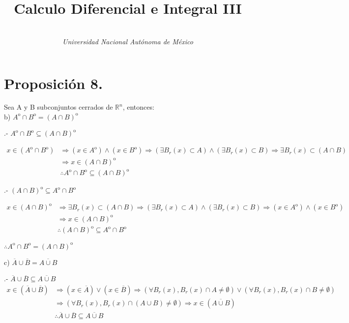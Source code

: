 \documentclass[secnumarabic,balancelastpage,amsmath,amssymb]{article}
\begin{document}
\title{\vspace{-15mm}\textbf{Calculo Diferencial e Integral III}}
\author{\\ \emph{Universidad Nacional Autónoma de México }}

\section{Proposición 8.}
Sea A y B subconjuntos cerrados de $\mathbb {R}^{n}$, entonces: \\

\noindent b) $A^{\mathrm{o}} \cap B^{\mathrm{o}} =  (A \cap B)^{\mathrm{o}}$ 

.- $A^{\mathrm{o}} \cap B^{\mathrm{o}} \subseteq (A \cap B)^{\mathrm{o}} $


\begin{equation}
\begin{aligned}
x \in (A^{\mathrm{o}} \cap B^{\mathrm{o}}) &\Rightarrow   (x \in A^{\mathrm{o}}) \land  (x \in B^{\mathrm{o}}) \Rightarrow (\exists B_r(x) \subset A) \land (\exists B_r(x) \subset B) \Rightarrow \exists B_r(x) \subset (A\cap B) \\
& \Rightarrow x \in (A \cap B)^{\mathrm{o}} \\
& \therefore A^{\mathrm{o}} \cap B^{\mathrm{o}} \subseteq (A \cap B)^{\mathrm{o}}
\end{aligned}
\end{equation}


.- $ (A \cap B)^{\mathrm{o}} \subseteq A^{\mathrm{o}} \cap B^{\mathrm{o}} $

\begin{equation}
\begin{aligned}
x \in (A \cap B)^{\mathrm{o}} & \Rightarrow \exists B_r(x) \subset (A \cap B) \Rightarrow (\exists B_r(x) \subset A) \land (\exists B_r(x) \subset B) \Rightarrow (x \in A^{\mathrm{o}})\land(x \in B^{\mathrm{o}}) \\
& \Rightarrow x\in (A \cap B)^{\mathrm{o}} \\
& \therefore  (A \cap B)^{\mathrm{o}} \subseteq A^{\mathrm{o}} \cap B^{\mathrm{o}}
\end{aligned}
\end{equation}

$\therefore  A^{\mathrm{o}} \cap B^{\mathrm{o}} =  (A \cap B)^{\mathrm{o}}$ 

\noindent c) $\overline{A} \cup \overline{B} = \overline{A \cup B}$ 

.- $\overline{A} \cup \overline{B} \subseteq \overline{A \cup B}$
\begin{equation}
\begin{aligned}
x \in  (\overline{A} \cup \overline{B} ) &\Rightarrow (x \in \overline{A}) \lor (x \in \overline{B}) \Rightarrow (\forall B_r(x), B_r(x) \cap A \neq \emptyset) \lor (\forall B_r(x), B_r(x) \cap B \neq \emptyset) \\
& \Rightarrow (\forall B_r(x), B_r(x) \cap (A \cup B) \neq \emptyset) \Rightarrow x \in (\overline{A \cup B}) \\
& \therefore \overline{A} \cup \overline{B} \subseteq \overline{A \cup B}
\end{aligned}
\end{equation}
\end{document}
